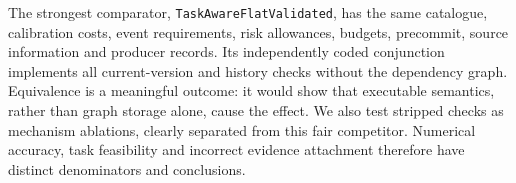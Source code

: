 The strongest comparator, \texttt{TaskAwareFlatValidated}, has the same catalogue, calibration costs, event requirements, risk allowances, budgets, precommit, source information and producer records. Its independently coded conjunction implements all current-version and history checks without the dependency graph. Equivalence is a meaningful outcome: it would show that executable semantics, rather than graph storage alone, cause the effect. We also test stripped checks as mechanism ablations, clearly separated from this fair competitor. Numerical accuracy, task feasibility and incorrect evidence attachment therefore have distinct denominators and conclusions.
